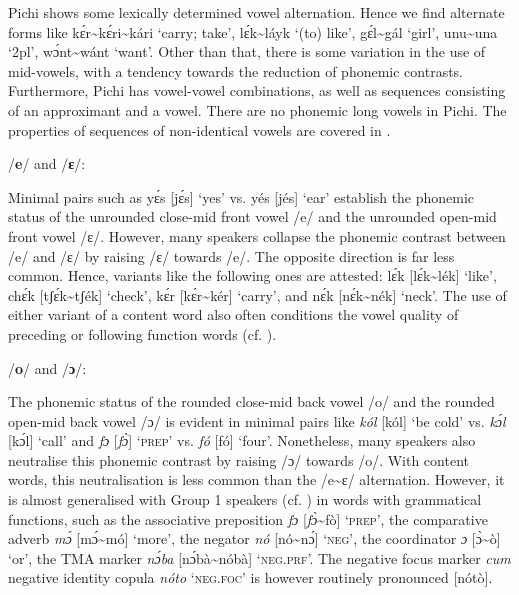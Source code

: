 Pichi shows some lexically determined vowel alternation. Hence we find alternate forms like kɛ́r{\textasciitilde}kɛ́ri{\textasciitilde}kári ‘carry; take’, lɛ́k{\textasciitilde}láyk ‘(to) like’, gɛ́l{\textasciitilde}gál ‘girl’, unu{\textasciitilde}una ‘2pl’, wɔ́nt{\textasciitilde}wánt ‘want’. Other than that, there is some variation in the use of mid-vowels, with a tendency towards the reduction of phonemic contrasts. Furthermore, Pichi has vowel-vowel combinations, as well as sequences consisting of an approximant and a vowel. There are no phonemic long vowels in Pichi. The properties of sequences of non-identical vowels are covered in .

/\textbf{e}/ and /\textbf{ɛ}/: 

Minimal pairs such as yɛ́s [jɛ́s] ‘yes’ vs. yés [jés] ‘ear’ establish the phonemic status of the unrounded close-mid front vowel /e/ and the unrounded open-mid front vowel /ɛ/. However, many speakers collapse the phonemic contrast between /e/ and /ɛ/ by raising /ɛ/ towards /e/. The opposite direction is far less common. Hence, variants like the following ones are attested: lɛ́k [lɛ́k{\textasciitilde}lék] ‘like’, chɛ́k [tʃɛ́k{\textasciitilde}tʃék] ‘check’, kɛ́r [kɛ́r{\textasciitilde}kér] ‘carry’, and nɛ́k [nɛ́k{\textasciitilde}nék] ‘neck’. The use of either variant of a content word also often conditions the vowel quality of preceding or following function words (cf. ).

/\textbf{o}/ and /\textbf{ɔ}/: 

The phonemic status of the rounded close-mid back vowel /o/ and the rounded open-mid back vowel /ɔ/ is evident in minimal pairs like \textit{kól} [kól] ‘be cold’ vs. \textit{kɔ́l} [kɔ́l] ‘call’ and \textit{fɔ} [\textit{\textup{fɔ̀}}] ‘\textsc{prep}’ vs. \textit{fó} [fó] ‘four’. Nonetheless, many speakers also neutralise this phonemic contrast by raising /ɔ/ towards /o/. With content words, this neutralisation is less common than the /e{\textasciitilde}ɛ/ alternation. However, it is almost generalised with Group 1 speakers (cf. ) in words with grammatical functions, such as the associative preposition \textit{fɔ} [\textit{\textup{fɔ̀}}{\textasciitilde}fò] ‘\textsc{prep}’, the comparative adverb \textit{mɔ́} [mɔ́{\textasciitilde}mó] ‘more’, the negator \textit{nó} [nó{\textasciitilde}nɔ́] ‘\textsc{neg}’, the coordinator \textit{ɔ} [ɔ̀{\textasciitilde}ò] ‘or’, the TMA marker \textit{nɔ́ba} [nɔ́bà{\textasciitilde}nóbà] ‘\textsc{neg.prf}’. The negative focus marker \textit{cum} negative identity copula \textit{nóto} ‘\textsc{neg}.\textsc{foc}’ is however routinely pronounced [nótò].

